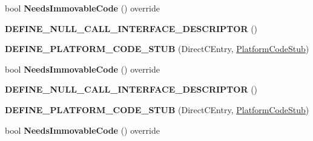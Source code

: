 \begin{DoxyCompactItemize}
\item 
bool {\bfseries Needs\+Immovable\+Code} () override\hypertarget{classv8_1_1internal_1_1_direct_c_entry_stub_a340e1e33a6ac2174c27d88a912d4ffa5}{}\label{classv8_1_1internal_1_1_direct_c_entry_stub_a340e1e33a6ac2174c27d88a912d4ffa5}

\item 
{\bfseries D\+E\+F\+I\+N\+E\+\_\+\+N\+U\+L\+L\+\_\+\+C\+A\+L\+L\+\_\+\+I\+N\+T\+E\+R\+F\+A\+C\+E\+\_\+\+D\+E\+S\+C\+R\+I\+P\+T\+OR} ()\hypertarget{classv8_1_1internal_1_1_direct_c_entry_stub_a2e23f5d604b369d53c99765704e01df0}{}\label{classv8_1_1internal_1_1_direct_c_entry_stub_a2e23f5d604b369d53c99765704e01df0}

\item 
{\bfseries D\+E\+F\+I\+N\+E\+\_\+\+P\+L\+A\+T\+F\+O\+R\+M\+\_\+\+C\+O\+D\+E\+\_\+\+S\+T\+UB} (Direct\+C\+Entry, \hyperlink{classv8_1_1internal_1_1_platform_code_stub}{Platform\+Code\+Stub})\hypertarget{classv8_1_1internal_1_1_direct_c_entry_stub_ae32a88d000afb47947a812cbad8d6a22}{}\label{classv8_1_1internal_1_1_direct_c_entry_stub_ae32a88d000afb47947a812cbad8d6a22}

\item 
bool {\bfseries Needs\+Immovable\+Code} () override\hypertarget{classv8_1_1internal_1_1_direct_c_entry_stub_a340e1e33a6ac2174c27d88a912d4ffa5}{}\label{classv8_1_1internal_1_1_direct_c_entry_stub_a340e1e33a6ac2174c27d88a912d4ffa5}

\item 
{\bfseries D\+E\+F\+I\+N\+E\+\_\+\+N\+U\+L\+L\+\_\+\+C\+A\+L\+L\+\_\+\+I\+N\+T\+E\+R\+F\+A\+C\+E\+\_\+\+D\+E\+S\+C\+R\+I\+P\+T\+OR} ()\hypertarget{classv8_1_1internal_1_1_direct_c_entry_stub_a2e23f5d604b369d53c99765704e01df0}{}\label{classv8_1_1internal_1_1_direct_c_entry_stub_a2e23f5d604b369d53c99765704e01df0}

\item 
{\bfseries D\+E\+F\+I\+N\+E\+\_\+\+P\+L\+A\+T\+F\+O\+R\+M\+\_\+\+C\+O\+D\+E\+\_\+\+S\+T\+UB} (Direct\+C\+Entry, \hyperlink{classv8_1_1internal_1_1_platform_code_stub}{Platform\+Code\+Stub})\hypertarget{classv8_1_1internal_1_1_direct_c_entry_stub_ae32a88d000afb47947a812cbad8d6a22}{}\label{classv8_1_1internal_1_1_direct_c_entry_stub_ae32a88d000afb47947a812cbad8d6a22}

\item 
bool {\bfseries Needs\+Immovable\+Code} () override\hypertarget{classv8_1_1internal_1_1_direct_c_entry_stub_a340e1e33a6ac2174c27d88a912d4ffa5}{}\label{classv8_1_1internal_1_1_direct_c_entry_stub_a340e1e33a6ac2174c27d88a912d4ffa5}


\end{DoxyCompactItemize}

